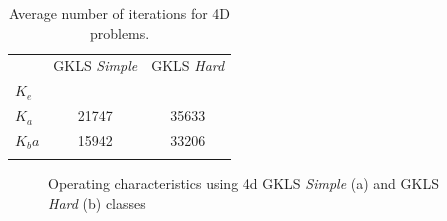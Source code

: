 \documentclass[runningheads]{llncs}
\begin{document}
\begin{table}
\centering
\caption{Average number of iterations for 4D problems.}\label{tab2}
\begin{tabular}{lcc}
\hline\noalign{\smallskip}
 &    GKLS \textit{Simple} &  GKLS \textit{Hard} \\
\noalign{\smallskip}\hline\noalign{\smallskip}
 $K_e$  &        &       \\
 $K_a$  &  21747 & 35633 \\
 $K_ba$ &  15942 & 33206 \\
\noalign{\smallskip}\hline
\end{tabular}
\end{table}

\begin{figure}
\begin{minipage}{0.5\linewidth}
\end{minipage}
\begin{minipage}{0.5\linewidth}
\end{minipage}
\caption{Operating characteristics using 4d GKLS \textit{Simple} (a) and GKLS \textit{Hard} (b) classes}
\label{fig3}
\end{figure}
\end{document}
